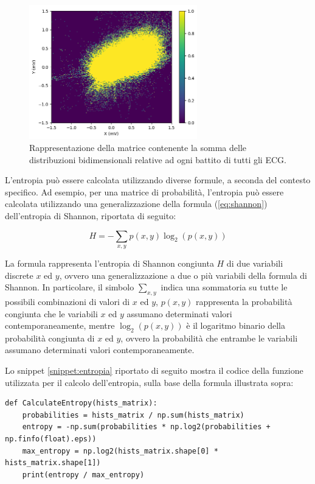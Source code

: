 \documentclass[12pt,italian]{report}
\begin{document}
\begin{figure}[H]
    \centering
    \includegraphics[width=0.65\textwidth]{immagini/hists.png}
    \captionsetup{justification=centering}
    \caption{Rappresentazione della matrice contenente la somma delle distribuzioni bidimensionali relative ad ogni battito di tutti gli ECG.}
    \label{fig:hists}
\end{figure}

L’entropia può essere calcolata utilizzando diverse formule, a seconda del contesto specifico. Ad esempio, per una matrice di probabilità, l’entropia può essere calcolata utilizzando una generalizzazione della formula (\ref{eq:shannon}) dell’entropia di Shannon, riportata di seguito:

\begin{equation}
    H = - \sum_{x,y} p(x,y) \log_2(p(x,y))
    \label{eq:shannon}
\end{equation}

La formula rappresenta l'entropia di Shannon congiunta $ H $ di due variabili discrete $ x $ ed $ y $, ovvero una generalizzazione a due o più variabili della formula di Shannon. In particolare, il simbolo $ \sum_{x,y} $ indica una sommatoria su tutte le possibili combinazioni di valori di $ x $ ed $ y $, $ p(x,y) $ rappresenta la probabilità congiunta che le variabili $ x $ ed $ y $ assumano determinati valori contemporaneamente, mentre $ \log_2(p(x,y)) $ è il logaritmo binario della probabilità congiunta di $ x $ ed $ y $, ovvero la probabilità che entrambe le variabili assumano determinati valori contemporaneamente.

Lo snippet \ref{snippet:entropia} riportato di seguito mostra il codice della funzione utilizzata per il calcolo dell'entropia, sulla base della formula illustrata sopra:

\lstset{language=Python}
\begin{lstlisting}[aboveskip=15pt, belowskip=15pt, basicstyle=\fontsize{8}{10}\selectfont, keywordstyle=\color{blue}, breaklines=true, label=snippet:entropia]
def CalculateEntropy(hists_matrix):
    probabilities = hists_matrix / np.sum(hists_matrix)
    entropy = -np.sum(probabilities * np.log2(probabilities + np.finfo(float).eps))
    max_entropy = np.log2(hists_matrix.shape[0] * hists_matrix.shape[1])
    print(entropy / max_entropy)
\end{lstlisting}
\end{document}
